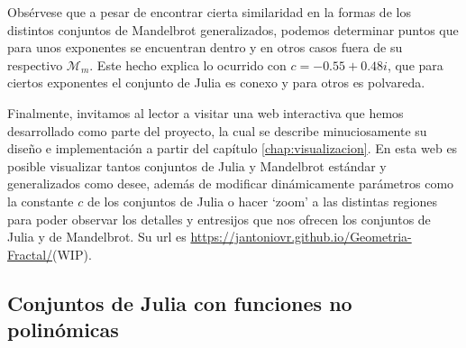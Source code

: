 Obsérvese que a pesar de encontrar cierta similaridad en la formas de los distintos conjuntos de Mandelbrot generalizados, podemos determinar puntos que para unos exponentes se encuentran dentro y en otros casos fuera de su respectivo $\mathcal{M}_m$. Este hecho explica lo ocurrido con $c=-0.55+0.48i$, que para ciertos exponentes el conjunto de Julia es conexo y para otros es polvareda.

Finalmente, invitamos al lector a visitar una web interactiva que hemos desarrollado como parte del proyecto, la cual se describe minuciosamente su diseño e implementación a partir del capítulo \ref{chap:visualizacion}. En esta web es posible visualizar tantos conjuntos de Julia y Mandelbrot estándar y generalizados como desee, además de modificar dinámicamente parámetros como la constante $c$ de los conjuntos de Julia o hacer `zoom' a las distintas regiones para poder observar los detalles y entresijos que nos ofrecen los conjuntos de Julia y de Mandelbrot. Su url es \url{https://jantoniovr.github.io/Geometria-Fractal/}(WIP).%

\newpage
\subsection{Conjuntos de Julia con funciones no polinómicas}

